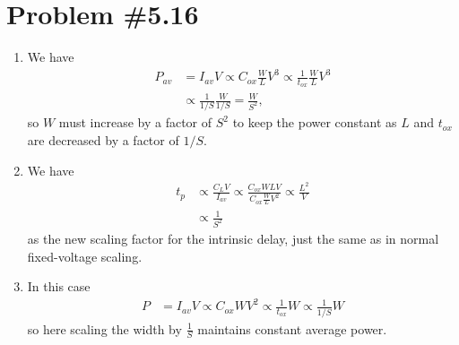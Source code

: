 \documentclass{article}
\begin{document}
\section*{Problem \#5.16}
\begin{enumerate}
  \item{
    We have
    \begin{align*}
             P_{av} 
    &=       I_{av} V
     \propto C_{ox} \frac{W}{L} V^3
     \propto \frac{1}{t_{ox}} \frac{W}{L} V^3 \\
    &\propto \frac{1}{1 / S} \frac{W}{1 / S} 
     =       \frac{W}{S^2},
    \end{align*}
    so $W$ must increase by a factor of $S^2$ to keep
    the power constant as $L$ and $t_{ox}$ are decreased
    by a factor of $1 / S$.
  }
  \item{
    We have
    \begin{align*}
              t_p 
    &\propto  \frac{C_L V}{I_{av}}
     \propto  \frac{C_{ox} W L V}{C_{ox} \frac{W}{L} V^2}
     \propto  \frac{L^2}{V} \\
    &\propto  \frac{1}{S^2}
    \end{align*}
    as the new scaling factor for the intrinsic delay,
    just the same as in normal fixed-voltage scaling.
  }
  \item{
    In this case
    \begin{align*}
               P
      &=       I_{av} V
       \propto C_{ox} W V^2
       \propto \frac{1}{t_{ox}} W
       \propto \frac{1}{1 / S} W
    \end{align*}
    so here scaling the width by $\frac{1}{S}$ maintains constant
    average power.
  }
\end{enumerate}
\end{document}
